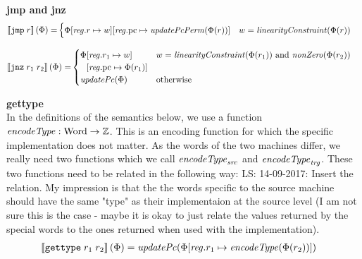 \documentclass[a4paper]{article}
\newcommand\lau[1]{{\color{purple} \sf \footnotesize {LS: #1}}\\}
\newcommand{\sem}[1]{\left\llbracket #1 \right\rrbracket}
\newcommand{\tand}{\text{ and }}
\newcommand{\totherwise}{\text{otherwise }}
\newcommand{\targetcolor}[1]{\color{black}}
\newcommand{\trg}[1]{{\targetcolor{} #1}}
\newcommand{\zinstr}[1]{\texttt{#1}}
\newcommand{\oneinstr}[2]{
  \ifthenelse{\equal{#2}{}}
  {\zinstr{#1}}
  {\zinstr{#1} \; #2}
}
\newcommand{\twoinstr}[3]{
  \ifthenelse{\equal{#2#3}{}}
  {\zinstr{#1}}
  {\zinstr{#1} \; #2 \; #3}
}
\newcommand{\tjmp}[1]{\oneinstr{\trg{jmp}}{#1}}
\newcommand{\tjnz}[2]{\twoinstr{\trg{jnz}}{#1}{#2}}
\newcommand{\tisptr}[2]{\twoinstr{\trg{gettype}}{#1}{#2}}
\newcommand{\ints}{\mathbb{Z}}
\newcommand{\update}[2]{[#1 \mapsto #2]}
\newcommand{\updReg}[2]{\update{\reg.#1}{#2}}
\newcommand{\shareddom}[1]{\mathrm{#1}}
\newcommand{\Word}{\shareddom{Word}}
\newcommand{\var}[1]{\mathit{#1}}
\newcommand{\reg}{\var{reg}}
\newcommand{\pcreg}{\mathrm{pc}}
\newcommand{\plainfun}[2]{
  \ifthenelse{\equal{#2}{}}
  {\mathit{#1}}
  {\mathit{#1}(#2)}
}
\newcommand{\encType}[1]{\plainfun{encodeType}{#1}}
\newcommand{\updPcAddr}[1]{\plainfun{updatePc}{#1}}
\newcommand{\updPcPerm}[1]{\plainfun{updatePcPerm}{#1}}
\newcommand{\linCons}[1]{\plainfun{linearityConstraint}{#1}}
\newcommand{\nonZero}[1]{\plainfun{nonZero}{#1}}
\begin{document}
\noindent\textbf{jmp and jnz}\\
\begin{align*}
  \sem{\tjmp{r}}(\Phi) = &  
                     \begin{cases}
                       \Phi\updReg{r}{w}\updReg{\pcreg}{\updPcPerm{\Phi(r)}} & w = \linCons{\Phi(r)}
                     \end{cases}
\end{align*}

\begin{align*}
  \sem{\tjnz{r_1}{r_2}}(\Phi) = &       
                             \begin{cases}
                               \arraycolsep=0pt
                               \begin{array}[t]{rl}
                                 \Phi&\updReg{r_1}{w}\\
                                     &\updReg{\pcreg}{\Phi(r_1)}
                               \end{array}
                                               & w = \linCons{\Phi(r_1)} \tand \nonZero{\Phi(r_2)}\\
                               \updPcAddr{\Phi} & \totherwise
                             \end{cases}
\end{align*}

\noindent\textbf{gettype}\\
In the definitions of the semantics below, we use a function $\encType{} : \Word \rightarrow \ints$. This is an encoding function for which the specific implementation does not matter. As the words of the two machines differ, we really need two functions which we call $\encType{}_{\var{src}}$ and $\encType{}_{\var{trg}}$. These two functions need to be related in the following way:
\lau{14-09-2017: Insert the relation. My impression is that the the words specific to the source machine should have the same "type" as their implementaion at the source level (I am not sure this is the case - maybe it is okay to just relate the values returned by the special words to the ones returned when used with the implementation). }
\begin{align*}
  \sem{\tisptr{r_1}{r_2}}(\Phi) = & \; \updPcAddr{}(\Phi\updReg{r_1}{\encType{\Phi(r_2)}})
\end{align*}
\end{document}
